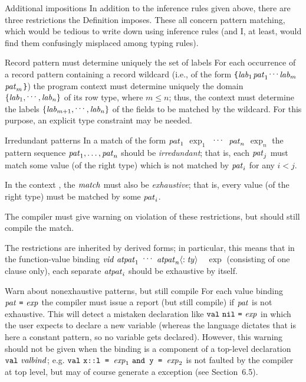 \begin{remark}{Additional impositions}
In addition to the inference rules given above, there are three
restrictions the Definition imposes. These all concern pattern matching,
which would be tedious to write down using inference rules (and I, at
least, would find them confusingly misplaced among typing rules).
\end{remark}

\begin{clause}{Record pattern must determine uniquely the set of labels}
For each occurrence of a record pattern containing a record wildcard
(i.e., of the form
\verb+{+${\it lab}_{1}$\ml{=}$\textit{pat\/}_{1}$\ml{,}$\mathinner{{}^{\textstyle .\,.\,.}}$\ml{,}${\it lab}_{m}$\ml{=}$\textit{pat\/}_{m}$\ml{,}\wildcardrow\verb+}+)
the program context must determine uniquely the domain
$\{{\it lab}_{1},\mathinner{{}^{\textstyle .\,.\,.}},{\it lab}_{n}\}$
of its row type, where $m\leq n$; thus, the context must
determine the labels $\{{\it lab}_{m+1},\mathinner{{}^{\textstyle .\,.\,.}},{\it lab}_{n}\}$ of the fields
to be matched by the wildcard. For this purpose, an explicit type
constraint may be needed.
\end{clause}

\begin{clause}{Irredundant patterns}
In a match of the form $\textit{pat\/}_{1}$ \ml{=>} $\exp_{1}$ \ml{|}$\;\mathinner{{}^{\textstyle .\,.\,.}}\;$
\ml{|} $\textit{pat\/}_{n}$ \ml{=>} $\exp_{n}$ 
the pattern sequence $\textit{pat\/}_{1},\ldots,\textit{pat\/}_{n}$ should be \emph{irredundant};
that is, each $\textit{pat\/}_{j}$ must match some value
(of the right type) which is not matched by $\textit{pat\/}_{i}$ for any $i<j$.

In the context {\fnexp}, the $\textit{match\/}$ must also be \emph{exhaustive}; that is,
every value (of the right type) must be matched by some $\textit{pat\/}_i$.

The compiler must give warning on violation of these restrictions, 
but should still compile the match. 

The restrictions are inherited by derived forms; in particular,
this means that in the function-value binding
$\textit{vid\/}\ \textit{atpat\/}_{1}\ \mathinner{{}^{\textstyle .\,.\,.}}\ \textit{atpat\/}_{n}\langle : \textit{ty\/}\rangle$\ \ml{=}\ $\exp$
(consisting of one clause only), each separate $\textit{atpat\/}_{i}$ should be
exhaustive by itself.
\end{clause}

\begin{clause}{Warn about nonexhaustive patterns, but still compile}\label{clause:static-core:warn-about-nonexhaustive-patterns}
For each value binding $\pat\ \mbox{\ml{=}}\ \exp$ the compiler must
issue a report (but still compile) if $\textit{pat\/}$ is not exhaustive.  This
will detect a mistaken declaration like
$\VAL\ \ml{nil}\ \mbox{\ml{=}}\ \exp$ in which the user expects to
declare a new variable  (whereas the language dictates that
 is here a constant pattern, so no variable gets declared).
However, this warning should not be given when the binding is a
component of a top-level declaration $\mbox{{\tt val}\ \textit{valbind\/}}$; e.g.
$\VAL\ \mbox{\ml{x::l = }}\exp_{1}\ \mbox{\ml{\AND\ y = }}\exp_{2}$ is not
faulted by the compiler at top level, but may of course generate a
 exception (see Section~6.5).
\end{clause}